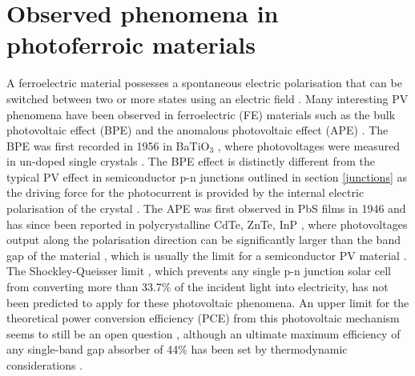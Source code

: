 \documentclass[11pt, twoside]{report}
\begin{document}
\section{Observed phenomena in photoferroic materials}\label{ferroPVsection}
A ferroelectric material possesses a spontaneous electric polarisation that can be switched between two or more states using an electric field \cite{new_FE_PV_1}. Many interesting PV phenomena have been observed in ferroelectric (FE) materials such as the bulk photovoltaic effect (BPE) and the anomalous photovoltaic effect (APE) \cite{keith}. 
The BPE was first recorded in 1956 in BaTiO$_3$ \cite{keith_46}, where photovoltages were measured in un-doped single crystals \cite{keith}.
The BPE effect is distinctly different from the typical PV effect in semiconductor
p-n junctions outlined in section \ref{junctions} as the driving force for the photocurrent is provided by the internal electric polarisation of the crystal \cite{FE_PV_rev1}. 
The APE was first observed in PbS films in 1946 \cite{keith_54} and has since been reported in polycrystalline CdTe, ZnTe, InP \cite{keith_55, keith_56, keith_57}, where photovoltages output along the polarisation direction can be significantly larger than the band gap of the material \cite{FE_PV_rev1}, which is usually the limit for a semiconductor PV material \cite{keith}. 
The Shockley-Queisser limit \cite{SQ_1961}, which prevents any single p-n junction solar cell from converting more than 33.7\% of the incident light into electricity, has not been predicted to apply for these photovoltaic phenomena. An upper limit for the theoretical power conversion efficiency (PCE) from this photovoltaic mechanism seems to still be an open question \cite{ FE-PV_kirchartz, new_FE_PV}, although an ultimate maximum efficiency of any single-band gap absorber of 44\% has been set by thermodynamic considerations \cite{SQ_1961}. 
\end{document}
